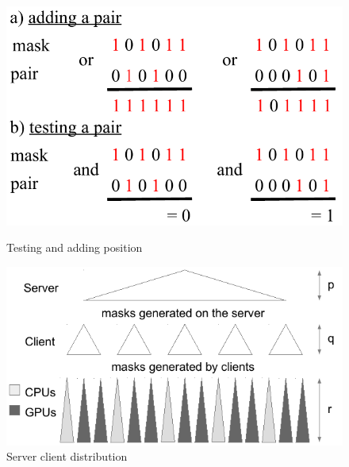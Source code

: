 \begin{figure}[t!]
\begin{minipage}[b]{0.5\linewidth}
\centering
\includegraphics[scale=.5]{figures/langford/test_gen}
\caption{Testing and adding position} \label{fig:test_et}
\end{minipage}
\begin{minipage}[b]{0.5\linewidth}
\centering 
\includegraphics[scale=.75]{figures/langford/graphe_repartition}   
\caption{Server client distribution} \label{fig:parallel} 

\end{minipage}
\end{figure}

 
